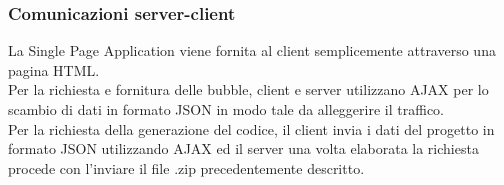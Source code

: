 \documentclass[../PianoDiQualifica.tex]{subfiles}
\begin{document}
			\subsubsection{Comunicazioni server-client}
				La Single Page Application viene fornita al client semplicemente attraverso una
				pagina HTML.\\
				Per la richiesta e fornitura delle bubble, client e server utilizzano AJAX per lo
				scambio di dati in formato JSON in modo tale da alleggerire il traffico.\\
				Per la richiesta della generazione del codice, il client invia i dati del progetto
				in formato JSON utilizzando AJAX ed il server una volta elaborata la richiesta procede
				con l'inviare il file .zip precedentemente descritto.
\end{document}
